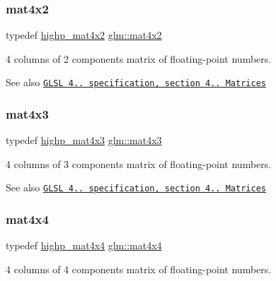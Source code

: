 \subsubsection{\texorpdfstring{mat4x2}{mat4x2}}
{\footnotesize\ttfamily typedef \mbox{\hyperlink{group__core__precision_ga0355949c79024224f7e9cfa06bc82153}{highp\+\_\+mat4x2}} \mbox{\hyperlink{group__core__types_ga72cf8ec4f4cda85943f4683531e421bc}{glm\+::mat4x2}}}

4 columns of 2 components matrix of floating-\/point numbers.

\begin{DoxySeeAlso}{See also}
\href{http://www.opengl.org/registry/doc/GLSLangSpec.4.20.8.pdf}{\tt G\+L\+SL 4.. specification, section 4.. Matrices} 
\end{DoxySeeAlso}
\mbox{\label{group__core__types_gad3f3f750dcdc74a9037342c5cae55f5e}} 
\subsubsection{\texorpdfstring{mat4x3}{mat4x3}}
{\footnotesize\ttfamily typedef \mbox{\hyperlink{group__core__precision_ga20620a62fd7d4e020e772c4d258cf2e4}{highp\+\_\+mat4x3}} \mbox{\hyperlink{group__core__types_gad3f3f750dcdc74a9037342c5cae55f5e}{glm\+::mat4x3}}}

4 columns of 3 components matrix of floating-\/point numbers.

\begin{DoxySeeAlso}{See also}
\href{http://www.opengl.org/registry/doc/GLSLangSpec.4.20.8.pdf}{\tt G\+L\+SL 4.. specification, section 4.. Matrices} 
\end{DoxySeeAlso}
\mbox{\label{group__core__types_ga63e3ee9447ed593484140a9368e738ec}} 
\subsubsection{\texorpdfstring{mat4x4}{mat4x4}}
{\footnotesize\ttfamily typedef \mbox{\hyperlink{group__core__precision_ga93c7db376e7b0bd24ef4947667468c9a}{highp\+\_\+mat4x4}} \mbox{\hyperlink{group__core__types_ga63e3ee9447ed593484140a9368e738ec}{glm\+::mat4x4}}}

4 columns of 4 components matrix of floating-\/point numbers.

